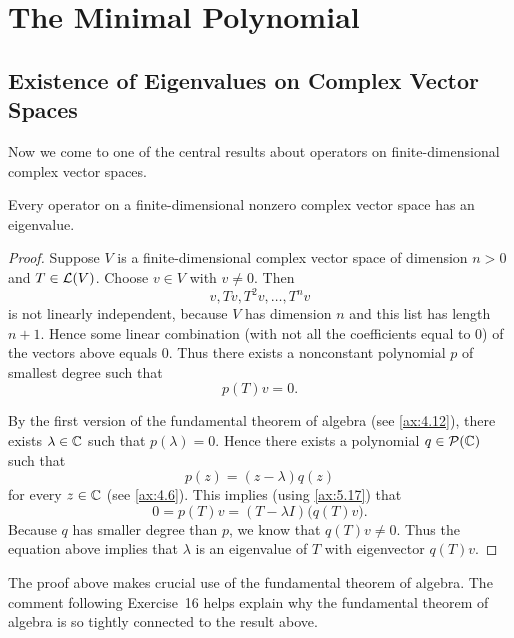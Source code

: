 \iftestbuild %
\setcounter{section}{1}\setcounter{theorem}{18}
\fi %
\DeclareRobustCommand\axeqtag{\refstepcounter{theorem}%
  \begingroup\edef\x{\endgroup\noexpand\tag{\thetheorem}}\x}

\section{The Minimal Polynomial}

\subsection{Existence of Eigenvalues on Complex Vector Spaces}

Now we come to one of the central results about operators on finite-dimensional
complex vector spaces.

\begin{result}\label{ax:5.19}
Every operator on a finite-dimensional nonzero complex vector space has an
eigenvalue.
\end{result}

\begin{proof}
Suppose $V$ is a finite-dimensional complex vector space of dimension $n>0$
and $T\in\mathcal{L}(V)$. Choose $v\in V$ with $v\ne0$. Then
\[ v,Tv,T^2v,\dots,T^nv \]
is not linearly independent, because $V$ has dimension $n$ and this list has
length $n+1$. Hence some linear combination (with not all the coefficients
equal to $0$) of the vectors above equals $0$. Thus there exists a nonconstant
polynomial $p$ of smallest degree such that
\[ p(T)v=0. \]

By the first version of the fundamental theorem of algebra (see
\ref{ax:4.12}), there exists $\lambda\in\mathbb{C}$ such that $p(\lambda)=0$. Hence
there exists a polynomial $q\in\mathcal{P}(\mathbb{C})$ such that
\[ p(z)=(z-\lambda)q(z) \]
for every $z\in\mathbb{C}$ (see \ref{ax:4.6}). This implies (using \ref{ax:5.17}) that
\[ 0=p(T)v=(T-\lambda I)\bigl(q(T)v\bigr). \]
Because $q$ has smaller degree than $p$, we know that $q(T)v\ne0$. Thus the
equation above implies that $\lambda$ is an eigenvalue of $T$ with eigenvector
$q(T)v$.
\end{proof}

The proof above makes crucial use of the fundamental theorem of algebra. The
comment following Exercise~16 helps explain why the fundamental theorem of
algebra is so tightly connected to the result above.

